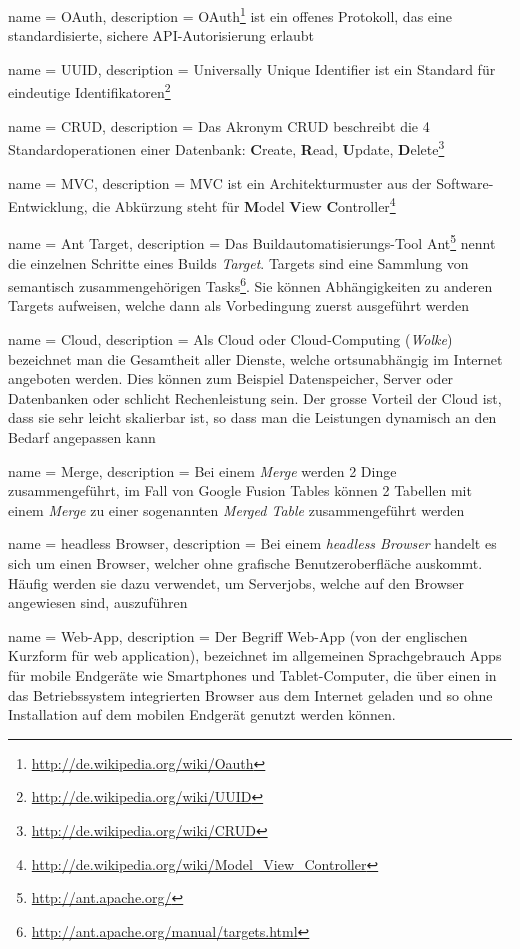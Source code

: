  {
	name = OAuth,
	description = {OAuth\footnote{\url{http://de.wikipedia.org/wiki/Oauth}} ist ein offenes Protokoll, das eine standardisierte, sichere API-Autorisierung erlaubt}
}

 {
	name = UUID,
	description = {Universally Unique Identifier ist ein Standard für eindeutige Identifikatoren\footnote{\url{http://de.wikipedia.org/wiki/UUID}}}
}

 {
	name = CRUD,
	description = {Das Akronym CRUD beschreibt die 4 Standardoperationen einer Datenbank: \textbf{C}reate, \textbf{R}ead, \textbf{U}pdate, \textbf{D}elete\footnote{\url{http://de.wikipedia.org/wiki/CRUD}}}
}

 {
	name = MVC,
	description = {MVC ist ein Architekturmuster aus der Software-Entwicklung, die Abkürzung steht für \textbf{M}odel \textbf{V}iew \textbf{C}ontroller\footnote{\url{http://de.wikipedia.org/wiki/Model_View_Controller}}}
}

 {
	name = Ant Target,
	description = {Das Buildautomatisierungs-Tool Ant\footnote{\url{http://ant.apache.org/}} nennt die einzelnen Schritte eines Builds \emph{Target}. Targets sind eine Sammlung von semantisch zusammengehörigen Tasks\footnote{\url{http://ant.apache.org/manual/targets.html}}. Sie können Abhängigkeiten zu anderen Targets aufweisen, welche dann als Vorbedingung zuerst ausgeführt werden}
}

 {
	name = Cloud,
	description = {Als Cloud oder Cloud-Computing (\emph{Wolke}) bezeichnet man die Gesamtheit aller Dienste, welche ortsunabhängig im Internet angeboten werden. Dies können zum Beispiel Datenspeicher, Server oder Datenbanken oder schlicht Rechenleistung sein. Der grosse Vorteil der Cloud ist, dass sie sehr leicht skalierbar ist, so dass man  die Leistungen dynamisch an den Bedarf angepassen kann\cite{cloud}}
}

 {
	name = Merge,
	description = {Bei einem \emph{Merge} werden 2 Dinge zusammengeführt, im Fall von Google Fusion Tables können 2 Tabellen mit einem \emph{Merge} zu einer sogenannten \emph{Merged Table} zusammengeführt werden}
}

 {
	name = headless Browser,
	description = {Bei einem \emph{headless Browser} handelt es sich um einen Browser, welcher ohne grafische Benutzeroberfläche auskommt. Häufig werden sie dazu verwendet, um Serverjobs, welche auf den Browser angewiesen sind, auszuführen}
}

 {
	name = Web-App,
	description = {Der Begriff Web-App (von der englischen Kurzform für web application), bezeichnet im allgemeinen Sprachgebrauch Apps für mobile Endgeräte wie Smartphones und Tablet-Computer, die über einen in das Betriebssystem integrierten Browser aus dem Internet geladen und so ohne Installation auf dem mobilen Endgerät genutzt werden können.\cite{webapp}}
}